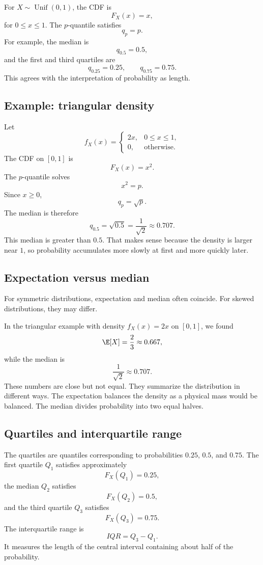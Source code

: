 For \(X\sim\operatorname{Unif}(0,1)\), the CDF is
\[
F_X(x)=x,
\]
for \(0\leq x\leq1\). The \(p\)-quantile satisfies
\[
q_p=p.
\]
For example, the median is
\[
q_{0.5}=0.5,
\]
and the first and third quartiles are
\[
q_{0.25}=0.25,
\qquad
q_{0.75}=0.75.
\]
This agrees with the interpretation of probability as length.

\subsection*{Example: triangular density}

Let
\[
f_X(x)=
\begin{cases}
2x, & 0\leq x\leq1,\\
0, & \text{otherwise}.
\end{cases}
\]
The CDF on \([0,1]\) is
\[
F_X(x)=x^2.
\]
The \(p\)-quantile solves
\[
x^2=p.
\]
Since \(x\geq0\),
\[
q_p=\sqrt p.
\]
The median is therefore
\[
q_{0.5}=\sqrt{0.5}=\frac1{\sqrt2}\approx0.707.
\]
This median is greater than \(0.5\). That makes sense because the density is
larger near \(1\), so probability accumulates more slowly at first and more
quickly later.

\subsection*{Expectation versus median}

For symmetric distributions, expectation and median often coincide. For skewed
distributions, they may differ.

In the triangular example with density \(f_X(x)=2x\) on \([0,1]\), we found
\[
\E[X]=\frac23\approx0.667,
\]
while the median is
\[
\frac1{\sqrt2}\approx0.707.
\]
These numbers are close but not equal. They summarize the distribution in
different ways. The expectation balances the density as a physical mass would be
balanced. The median divides probability into two equal halves.

\subsection*{Quartiles and interquartile range}

The quartiles are quantiles corresponding to probabilities \(0.25\), \(0.5\), and
\(0.75\). The first quartile \(Q_1\) satisfies approximately
\[
F_X(Q_1)=0.25,
\]
the median \(Q_2\) satisfies
\[
F_X(Q_2)=0.5,
\]
and the third quartile \(Q_3\) satisfies
\[
F_X(Q_3)=0.75.
\]
The interquartile range is
\[
IQR=Q_3-Q_1.
\]
It measures the length of the central interval containing about half of the
probability.

